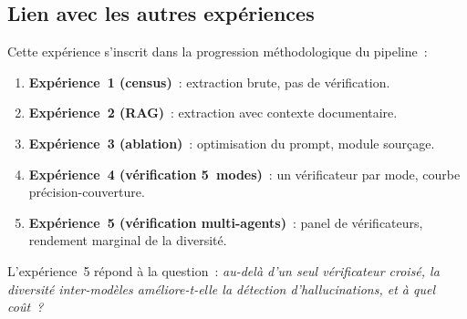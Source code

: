 \subsection{Lien avec les autres exp\'eriences}\label{sec:multi-verif-links}

Cette exp\'erience s'inscrit dans la progression m\'ethodologique du pipeline~:

\begin{enumerate}
\item \textbf{Exp\'erience~1 (census)}~: extraction brute, pas de v\'erification.
\item \textbf{Exp\'erience~2 (RAG)}~: extraction avec contexte documentaire.
\item \textbf{Exp\'erience~3 (ablation)}~: optimisation du prompt, module sourçage.
\item \textbf{Exp\'erience~4 (v\'erification 5~modes)}~: un v\'erificateur par
  mode, courbe pr\'ecision-couverture.
\item \textbf{Exp\'erience~5 (v\'erification multi-agents)}~: panel de
  v\'erificateurs, rendement marginal de la diversit\'e.
\end{enumerate}

\noindent L'exp\'erience~5 r\'epond \`a la question~: \emph{au-del\`a d'un seul
v\'erificateur crois\'e, la diversit\'e inter-mod\`eles am\'eliore-t-elle la
d\'etection d'hallucinations, et \`a quel co\^ut~?}
